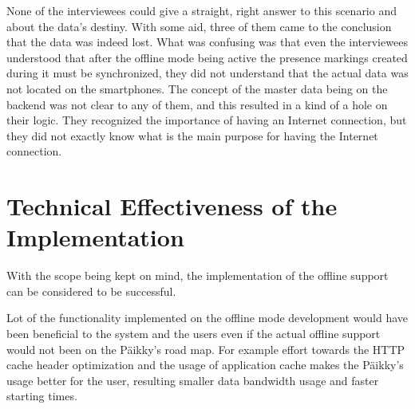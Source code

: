 None of the interviewees could give a straight, right answer to this scenario and about the data's destiny. With some aid, three of them came to the conclusion that the data was indeed lost. What was confusing was that even the interviewees understood that after the offline mode being active the presence markings created during it must be synchronized, they did not understand that the actual data was not located on the smartphones. The concept of the master data being on the backend was not clear to any of them, and this resulted in a kind of a hole on their logic. They recognized the importance of having an Internet connection, but they did not exactly know what is the main purpose for having the Internet connection.







\section{Technical Effectiveness of the Implementation}





With the scope being kept on mind, the implementation of the offline support can be considered to be successful. 

Lot of the functionality implemented on the offline mode development would have been beneficial to the system and the users even if the actual offline support would not been on the Päikky's road map. For example effort towards the HTTP cache header optimization and the usage of application cache makes the Päikky's usage better for the user, resulting smaller data bandwidth usage and faster starting times.

